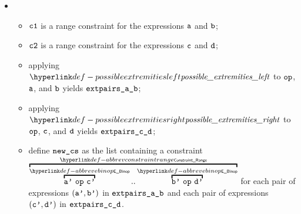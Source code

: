 \begin{itemize}
  \item {}
  \begin{itemize}
    \item $\vcone$ is a range constraint for the expressions $\va$ and $\vb$;
    \item $\vctwo$ is a range constraint for the expressions $\vc$ and $\vd$;
    \item applying $\possibleextremitiesleft$ to $\op$, $\va$, and $\vb$ yields $\extpairsab$;
    \item applying $\possibleextremitiesright$ to $\op$, $\vc$, and $\vd$ yields $\extpairscd$;
    \item define $\newcs$ as the list containing a constraint $\AbbrevConstraintRange{\AbbrevEBinop{\op}{\vap}{\vcp}}{\AbbrevEBinop{\op}{\vbp}{\vdp}}$
          for each pair of expressions
          $(\vap, \vbp)$ in $\extpairsab$
          and each pair of expressions
          $(\vcp, \vdp)$ in $\extpairscd$.
  \end{itemize}
\end{itemize}

\FormallyParagraph
\begin{mathpar}
\end{mathpar}

\begin{mathpar}
\end{mathpar}

\begin{mathpar}
\end{mathpar}

